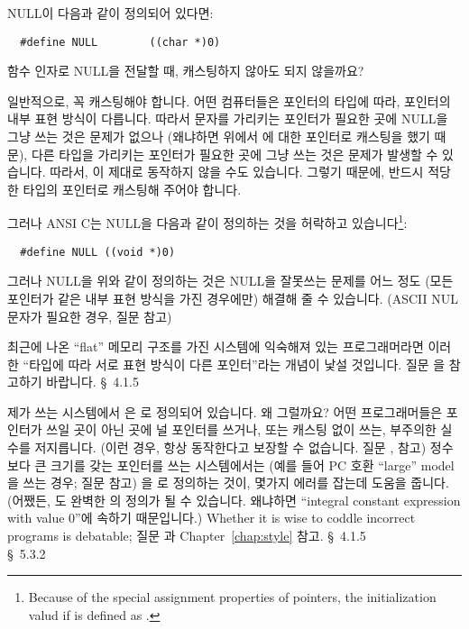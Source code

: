 \begin{faq}
	NULL이 다음과 같이 정의되어 있다면:
\begin{verbatim}
  #define NULL        ((char *)0)
\end{verbatim}

	함수 인자로 NULL을 전달할 때, 캐스팅하지 않아도 되지 않을까요?

\A
	일반적으로, 꼭 캐스팅해야 합니다. 어떤 컴퓨터들은 포인터의 타입에 따라,
	포인터의 내부 표현 방식이 다릅니다.
	따라서 문자를 가리키는 포인터가 필요한 곳에 NULL을 그냥 쓰는 것은
	문제가 없으나 (왜냐하면 위에서 에 대한 포인터로 캐스팅을
	했기 때문), 다른 타입을 가리키는 포인터가 필요한 곳에 그냥 쓰는
	것은 문제가 발생할 수 있습니다. 따라서, 이
	제대로 동작하지 않을 수도 있습니다. 그렇기 때문에, 반드시 적당한 타입의
	포인터로 캐스팅해 주어야 합니다.

	그러나 ANSI C는 NULL을 다음과 같이 정의하는 것을 허락하고
	있습니다\footnote{Because of the special assignment properties of
	   pointers, the initialization 
	   valud if  is defined as .}:

\begin{verbatim}
  #define NULL ((void *)0)
\end{verbatim}

	그러나 NULL을 위와 같이 정의하는 것은 NULL을 잘못쓰는
	문제를 어느 정도 (모든 포인터가 같은 내부 표현 방식을 가진 경우에만)
	해결해 줄 수 있습니다. (ASCII NUL 문자가 필요한 경우, 질문  참고)

	최근에 나온 ``flat'' 메모리 구조를 가진 시스템에 익숙해져 있는
	프로그래머라면 이러한 ``타입에 따라 서로 표현 방식이 다른 포인터''라는
	개념이 낯설 것입니다. 질문 을 참고하기 바랍니다.
\R
	\cite{rationale} \S\ 4.1.5
\end{faq}

\begin{faq}
	제가 쓰는 시스템에서 은 로 정의되어 있습니다.
	왜 그럴까요?
\A
	어떤 프로그래머들은 포인터가 쓰일 곳이 아닌 곳에 널 포인터를
	쓰거나, 또는 캐스팅 없이 쓰는, 부주의한 실수를 저지릅니다.
	(이런 경우, 항상 동작한다고 보장할 수 없습니다. 질문 ,  참고)
	정수보다 큰 크기를 갖는 포인터를 쓰는 시스템에서는 (예를 들어
	PC 호환 ``large'' model을 쓰는 경우; 질문  참고) 을
	로 정의하는 것이, 몇가지 에러를 잡는데 도움을 줍니다.
	(어쨌든, 도 완벽한 의 정의가 될 수 있습니다. 왜냐하면
	``integral constant expression  with value 0''에 속하기 때문입니다.)
	Whether it is wise to coddle incorrect programs is debatable;
	질문 과 Chapter~\ref{chap:style} 참고.
\R
	\cite{rationale} \S\ 4.1.5 \\
	\cite{hs} \S\ 5.3.2 
\end{faq}

